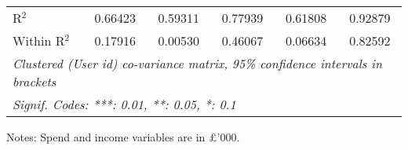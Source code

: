 \begin{table}[htbp]
\begin{threeparttable}[b]
\begin{tabular}{lccccc}
         R$^2$                     & 0.66423        & 0.59311        & 0.77939        & 0.61808          & 0.92879\\  
         Within R$^2$              & 0.17916        & 0.00530        & 0.46067        & 0.06634          & 0.82592\\  
         \midrule \midrule
         \multicolumn{6}{l}{\emph{Clustered (User id) co-variance matrix, 95\% confidence intervals in brackets}}\\
         \multicolumn{6}{l}{\emph{Signif. Codes: ***: 0.01, **: 0.05, *: 0.1}}\\
      \end{tabular}
      
      \begin{tablenotes}\footnotesize
         \item Notes: Spend and income variables are in \pounds'000.
      \end{tablenotes}
   \end{threeparttable}
\end{table}


